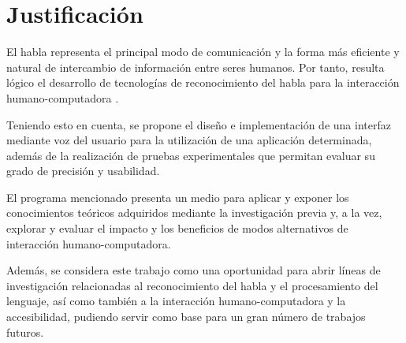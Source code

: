 \section{Justificaci\'{o}n}
\label{sec:just}

El habla representa el principal modo de comunicaci\'{o}n y la forma m\'{a}s eficiente y natural de 
intercambio de informaci\'{o}n entre seres humanos. Por tanto, resulta l\'{o}gico el desarrollo 
de tecnolog\'{i}as de reconocimiento del habla para la interacci\'{o}n humano-computadora \cite{GaikwadAReview2010}. 

Teniendo esto en cuenta, se propone el dise\~{n}o e implementaci\'{o}n de una interfaz mediante voz 
del usuario para la utilizaci\'{o}n de una aplicaci\'{o}n determinada, adem\'{a}s de la 
realizaci\'{o}n de pruebas experimentales que permitan evaluar su grado de precisi\'{o}n y usabilidad.

El programa mencionado presenta un medio para aplicar y exponer los conocimientos te\'{o}ricos 
adquiridos mediante la investigaci\'{o}n previa y, a la vez, explorar y evaluar el impacto y 
los beneficios de modos alternativos de interacci\'{o}n humano-computadora.

Adem\'{a}s, se considera este trabajo como una oportunidad para abrir l\'{i}neas de investigaci\'{o}n 
relacionadas al reconocimiento del habla y el procesamiento del lenguaje, as\'{i} como tambi\'{e}n a 
la interacci\'{o}n humano-computadora y la accesibilidad, pudiendo servir como base para un 
gran n\'{u}mero de trabajos futuros.
